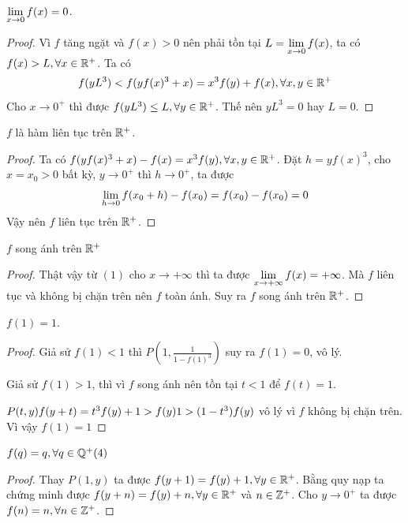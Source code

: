\documentclass[11pt]{scrartcl}
\begin{document}
\begin{itemize}[label=, leftmargin=0em, itemsep=0.5em]
\begin{sol}
         $\displaystyle\lim_{x \to 0}f(x) = 0$. 
        \begin{proof}
            Vì $f$ tăng ngặt và $f(x) > 0$ nên phải tồn tại $L = \displaystyle\lim_{x \to 0}f(x)$, ta có $f(x) > L, \forall x\in \mathbb{R^+}$. Ta có 
            \[
            f(yL^3) < f(yf(x)^3 + x) = x^3f(y) + f(x), \forall x,y \in \mathbb{R^+}
            \]
            Cho $x \to 0^+$ thì được $f(yL^3) \leq L, \forall y\in \mathbb{R^+}$. Thế nên $yL^3 = 0$ hay $L = 0$.
            
        \end{proof}
         $f$ là hàm liên tục trên $\mathbb{R^+}$. 
        \begin{proof}
            Ta có $f(yf(x)^3 + x) - f(x) = x^3f(y), \forall x,y \in \mathbb{R^+}$. Đặt $h = yf(x)^3$, cho $x =x_0 > 0$ bất kỳ, $y \to 0^+$ thì $h \to 0^+$, ta được 
            \[
                \displaystyle\lim_{h \to 0} f(x_0 + h) - f(x_0) =  f(x_0) - f(x_0) = 0
            \]
            Vậy nên $f$ liên tục trên $\mathbb{R}^+$.
        \end{proof}
        
         $f$ song ánh trên $\mathbb{R^+}$
        \begin{proof}
            Thật vậy từ $(1)$ cho $x \to +\infty$ thì ta được $\displaystyle\lim_{x \to +\infty} f(x) = +\infty$. Mà $f$ liên tục và không bị chặn trên nên $f$ toàn ánh. Suy ra $f$ song ánh trên $\mathbb{R^+}$.
        \end{proof}
         $f(1) = 1$. 
        \begin{proof}
            Giả sử $f(1)  < 1$ thì $P\left(1,\frac{1}{1-f(1)^3}\right)$ suy ra $f(1) = 0$, vô lý.

            Giả sử $f(1) > 1$, thì vì $f$ song ánh nên tồn tại $t < 1$ để $f(t) = 1$. 
            
            $P(t,y) \ra f(y + t) = t^3f(y) + 1 > f(y) \lra 1 > (1 - t^3)f(y)$ vô lý vì $f$ không bị chặn trên. Vì vậy $f(1) = 1$
        \end{proof}
        $f(q) = q, \forall q \in \mathbb{Q^+} (4)$ 
        \begin{proof}
            Thay $P(1,y)$ ta được $f(y + 1) = f(y) + 1, \forall y\in \mathbb{R^+}$. Bằng quy nạp ta chứng minh được $f(y + n) = f(y) + n, \forall y\in \mathbb{R^+}$ và $n \in \mathbb{Z^+}$. Cho $y \to 0^+$ ta được $f(n) = n,\forall n \in \mathbb{Z^+}$.


\end{proof}
\end{sol}
\end{itemize}
\end{document}
